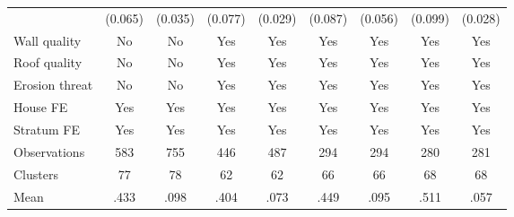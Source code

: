 {\begin{tabular}{l*{8}{c}}
                &  (0.065)         &  (0.035)         &  (0.077)         &  (0.029)         &  (0.087)         &  (0.056)         &  (0.099)         &  (0.028)         \\
Wall quality    &       No         &       No         &      Yes         &      Yes         &      Yes         &      Yes         &      Yes         &      Yes         \\
Roof quality    &       No         &       No         &      Yes         &      Yes         &      Yes         &      Yes         &      Yes         &      Yes         \\
Erosion threat  &       No         &       No         &      Yes         &      Yes         &      Yes         &      Yes         &      Yes         &      Yes         \\
House FE        &      Yes         &      Yes         &      Yes         &      Yes         &      Yes         &      Yes         &      Yes         &      Yes         \\
Stratum FE      &      Yes         &      Yes         &      Yes         &      Yes         &      Yes         &      Yes         &      Yes         &      Yes         \\
\hline
Observations    &      583         &      755         &      446         &      487         &      294         &      294         &      280         &      281         \\
Clusters        &       77         &       78         &       62         &       62         &       66         &       66         &       68         &       68         \\
Mean            &     .433         &     .098         &     .404         &     .073         &     .449         &     .095         &     .511         &     .057         \\
\hline\hline
\end{tabular}
}
